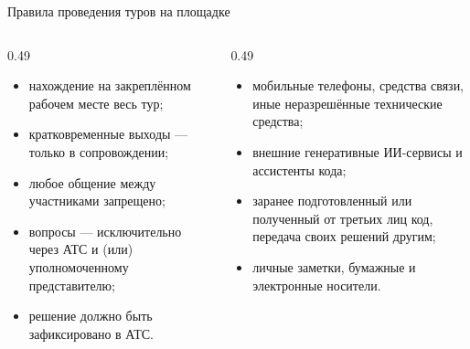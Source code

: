 \begin{frame}{Правила проведения туров на площадке}
  \vspace{0.2em}
  \begin{columns}[T]
    \begin{column}{0.49\textwidth}
      \begin{itemize}\setlength\itemsep{0.3em}
        \item нахождение на закреплённом рабочем месте весь тур;
        \item кратковременные выходы --- только в сопровождении;
        \item любое общение между участниками запрещено;
        \item вопросы --- исключительно через АТС и (или)
              уполномоченному представителю;
        \item решение должно быть зафиксировано в АТС.
      \end{itemize}
    \end{column}
    \begin{column}{0.49\textwidth}
      \begin{itemize}\setlength\itemsep{0.3em}
        \item мобильные телефоны, средства связи, иные неразрешённые
              технические средства;
        \item внешние генеративные ИИ-сервисы и ассистенты кода;
        \item заранее подготовленный или полученный от третьих лиц код,
              передача своих решений другим;
        \item личные заметки, бумажные и электронные носители.
      \end{itemize}
    \end{column}
  \end{columns}
\end{frame}
